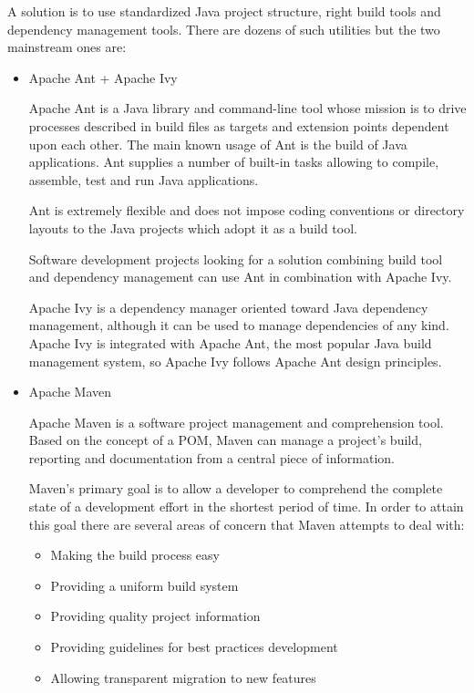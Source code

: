 	A solution is to use standardized Java project structure, right build tools and dependency management tools. There are
	dozens of such utilities but the two mainstream ones are:
	
	\begin{itemize}
		\item Apache Ant + Apache Ivy

		\cite{ant}		
		Apache Ant is a Java library and command-line tool whose mission is to drive processes described in build files as
		targets and extension points dependent upon each other. The main known usage of Ant is the build of Java applications.
		Ant supplies a number of built-in tasks allowing to compile, assemble, test and run Java applications.
		
		Ant is extremely flexible and does not impose coding conventions or directory layouts to the Java projects which adopt
		it as a build tool.

		Software development projects looking for a solution combining build tool and dependency management can use Ant in
		combination with Apache Ivy.
		
		\cite{ivy}
		Apache Ivy is a dependency manager oriented toward Java dependency management, although it can be used to manage
		dependencies of any kind. Apache Ivy is integrated with Apache Ant, the most popular Java build management system, so
		Apache Ivy follows Apache Ant design principles.
		\item Apache Maven
	  
		\cite{maven}
	  	Apache Maven is a software project management and comprehension tool. Based on the concept of a \gls{POM}, Maven can
	  	manage a project's build, reporting and documentation from a central piece of information.
	  
	  	Maven's primary goal is to allow a developer to comprehend the complete state of a development effort in the
	  	shortest period of time. In order to attain this goal there are several areas of concern that Maven attempts to deal
	  	with:
		
		\begin{itemize}
			\item Making the build process easy
			\item Providing a uniform build system
			\item Providing quality project information
			\item Providing guidelines for best practices development
			\item Allowing transparent migration to new features
		\end{itemize}
	\end{itemize}
	
